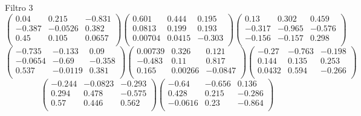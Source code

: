 Filtro 3
{ \small
\[
\begin{pmatrix}
  0.04 & 0.215 & -0.831 \\
  -0.387 & -0.0526 & 0.382 \\
  0.45 & 0.105 & 0.0657 \\
\end{pmatrix}
\begin{pmatrix}
  0.601 & 0.444 & 0.195 \\
  0.0813 & 0.199 & 0.193 \\
  0.00704 & 0.0415 & -0.303 \\
\end{pmatrix}
\begin{pmatrix}
  0.13 & 0.302 & 0.459 \\
  -0.317 & -0.965 & -0.576 \\
  -0.156 & -0.157 & 0.298 \\
\end{pmatrix}
\]
\[
\begin{pmatrix}
  -0.735 & -0.133 & 0.09 \\
  -0.0654 & -0.69 & -0.358 \\
  0.537 & -0.0119 & 0.381 \\
\end{pmatrix}
\begin{pmatrix}
  0.00739 & 0.326 & 0.121 \\
  -0.483 & 0.11 & 0.817 \\
  0.165 & 0.00266 & -0.0847 \\
\end{pmatrix}
\begin{pmatrix}
  -0.27 & -0.763 & -0.198 \\
  0.144 & 0.135 & 0.253 \\
  0.0432 & 0.594 & -0.266 \\
\end{pmatrix}
\]
\[
\begin{pmatrix}
  -0.244 & -0.0823 & -0.293 \\
  0.294 & 0.478 & -0.575 \\
  0.57 & 0.446 & 0.562 \\
\end{pmatrix}
\begin{pmatrix}
  -0.64 & -0.656 & 0.136 \\
  0.428 & 0.215 & -0.286 \\
  -0.0616 & 0.23 & -0.864 \\
\end{pmatrix}
\]
}

